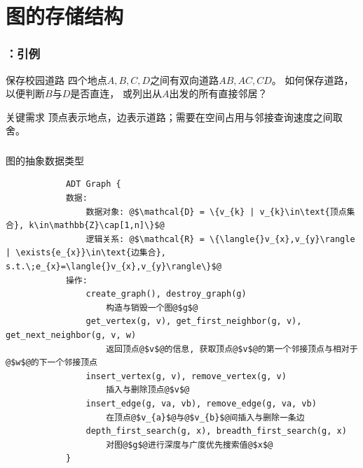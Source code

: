 \section{图的存储结构}

\begin{frame}
    \frametitle{\insertsectionhead：引例}
    \begin{exampleblock}{保存校园道路}
        四个地点$A,B,C,D$之间有双向道路$AB,AC,CD$。
        如何保存道路，以便判断$B$与$D$是否直连，
        或列出从$A$出发的所有直接邻居？
    \end{exampleblock}
    \begin{block}{关键需求}
        顶点表示地点，边表示道路；需要在空间占用与邻接查询速度之间取舍。
    \end{block}
\end{frame}

\begin{fragile}
    \frametitle{\insertsectionhead}
    \begin{block}{图的抽象数据类型}
        \begin{verbatim}
            ADT Graph {
            数据:
                数据对象: @$\mathcal{D} = \{v_{k} | v_{k}\in\text{顶点集合}, k\in\mathbb{Z}\cap[1,n]\}$@
                逻辑关系: @$\mathcal{R} = \{\langle{}v_{x},v_{y}\rangle | \exists{e_{x}}\in\text{边集合}, s.t.\;e_{x}=\langle{}v_{x},v_{y}\rangle\}$@
            操作:
                create_graph(), destroy_graph(g)
                    构造与销毁一个图@$g$@
                get_vertex(g, v), get_first_neighbor(g, v), get_next_neighbor(g, v, w)
                    返回顶点@$v$@的信息, 获取顶点@$v$@的第一个邻接顶点与相对于@$w$@的下一个邻接顶点
                insert_vertex(g, v), remove_vertex(g, v)
                    插入与删除顶点@$v$@
                insert_edge(g, va, vb), remove_edge(g, va, vb)
                    在顶点@$v_{a}$@与@$v_{b}$@间插入与删除一条边
                depth_first_search(g, x), breadth_first_search(g, x)
                    对图@$g$@进行深度与广度优先搜索值@$x$@
            }
        \end{verbatim}
    \end{block}
\end{fragile}

